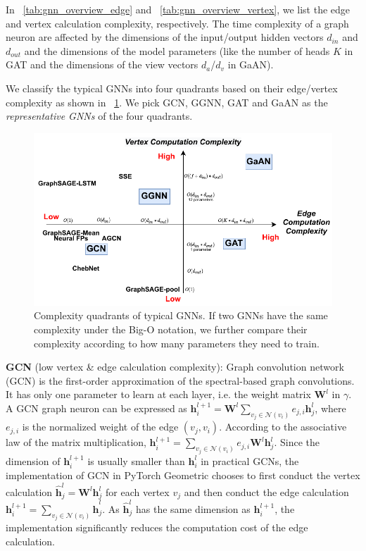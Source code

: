 In \tablename~\ref{tab:gnn_overview_edge} and \tablename~\ref{tab:gnn_overview_vertex}, we list the edge and vertex calculation complexity, respectively.
The time complexity of a graph neuron are affected by the dimensions of the input/output hidden vectors $d_{in}$ and $d_{out}$ and the dimensions of the model parameters (like the number of heads $K$ in GAT and the dimensions of the view vectors $d_a$/$d_v$ in GaAN).

We classify the typical GNNs into four quadrants based on their edge/vertex complexity as shown in \figurename~\ref{fig:gnn_complexity_quadrant}. We pick GCN, GGNN, GAT and GaAN as the \emph{representative GNNs} of the four quadrants.

\begin{figure}
	\centering
	\includegraphics[width=0.7\columnwidth]{fig_GNN_complexity_quadrant.pdf}
	\caption{Complexity quadrants of typical GNNs. If two GNNs have the same complexity under the Big-O notation, we further compare their complexity according to how many parameters they need to train.}
	\label{fig:gnn_complexity_quadrant}
\end{figure}

\textbf{GCN} \cite{kipf2017_gcn} (low vertex \& edge calculation complexity): Graph convolution network (GCN) is the first-order approximation of the spectral-based graph convolutions.
It has only one parameter to learn at each layer, i.e. the weight matrix $\boldsymbol{W}^l$ in $\gamma$.
A GCN graph neuron can be expressed as $\boldsymbol{h}^{l+1}_i = \boldsymbol{W}^l\sum_{v_j \in \mathcal{N}(v_i)}{e_{j,i}\boldsymbol{h}^l_j}$, where $e_{j,i}$ is the normalized weight of the edge $(v_j, v_i)$.
According to the associative law of the matrix multiplication, $\boldsymbol{h}^{l+1}_i = \sum_{v_j \in \mathcal{N}(v_i)}{e_{j,i}\boldsymbol{W}^l\boldsymbol{h}^l_j}$.
Since the dimension of $\boldsymbol{h}^{l+1}_i$ is usually smaller than $\boldsymbol{h}^l_i$ in practical GCNs, the implementation of GCN in PyTorch Geometric chooses to first conduct the vertex calculation $\hat{\boldsymbol{h}}^l_j = \boldsymbol{W}^l\boldsymbol{h}^l_j$ for each vertex $v_j$ and then conduct the edge calculation $\boldsymbol{h}^{l+1}_i=\sum_{v_j\in\mathcal{N}(v_i)}{\hat{\boldsymbol{h}}^l_j}$.
As $\hat{\boldsymbol{h}}^l_j$ has the same dimension as $\boldsymbol{h}^{l+1}_i$, the implementation significantly reduces the  computation cost of the edge calculation.

